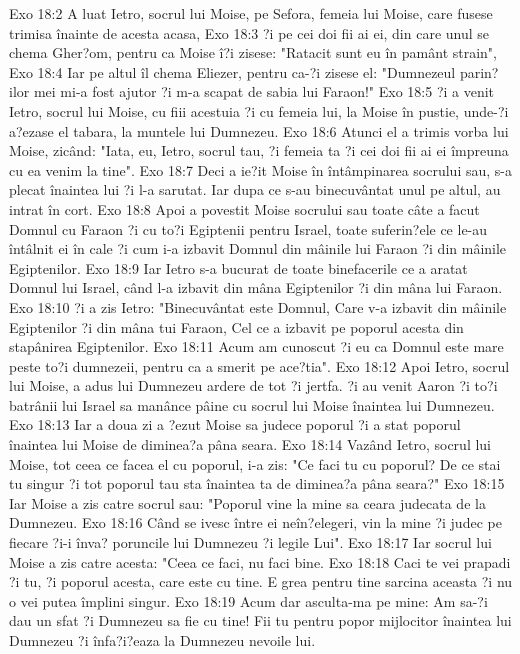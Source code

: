 Exo 18:2  A luat Ietro, socrul lui Moise, pe Sefora, femeia lui Moise, care fusese trimisa înainte de acesta acasa,
Exo 18:3  ?i pe cei doi fii ai ei, din care unul se chema Gher?om, pentru ca Moise î?i zisese: "Ratacit sunt eu în pamânt strain",
Exo 18:4  Iar pe altul îl chema Eliezer, pentru ca-?i zisese el: "Dumnezeul parin?ilor mei mi-a fost ajutor ?i m-a scapat de sabia lui Faraon!"
Exo 18:5  ?i a venit Ietro, socrul lui Moise, cu fiii acestuia ?i cu femeia lui, la Moise în pustie, unde-?i a?ezase el tabara, la muntele lui Dumnezeu.
Exo 18:6  Atunci el a trimis vorba lui Moise, zicând: "Iata, eu, Ietro, socrul tau, ?i femeia ta ?i cei doi fii ai ei împreuna cu ea venim la tine".
Exo 18:7  Deci a ie?it Moise în întâmpinarea socrului sau, s-a plecat înaintea lui ?i l-a sarutat. Iar dupa ce s-au binecuvântat unul pe altul, au intrat în cort.
Exo 18:8  Apoi a povestit Moise socrului sau toate câte a facut Domnul cu Faraon ?i cu to?i Egiptenii pentru Israel, toate suferin?ele ce le-au întâlnit ei în cale ?i cum i-a izbavit Domnul din mâinile lui Faraon ?i din mâinile Egiptenilor.
Exo 18:9  Iar Ietro s-a bucurat de toate binefacerile ce a aratat Domnul lui Israel, când l-a izbavit din mâna Egiptenilor ?i din mâna lui Faraon.
Exo 18:10  ?i a zis Ietro: "Binecuvântat este Domnul, Care v-a izbavit din mâinile Egiptenilor ?i din mâna tui Faraon, Cel ce a izbavit pe poporul acesta din stapânirea Egiptenilor.
Exo 18:11  Acum am cunoscut ?i eu ca Domnul este mare peste to?i dumnezeii, pentru ca a smerit pe ace?tia".
Exo 18:12  Apoi Ietro, socrul lui Moise, a adus lui Dumnezeu ardere de tot ?i jertfa. ?i au venit Aaron ?i to?i batrânii lui Israel sa manânce pâine cu socrul lui Moise înaintea lui Dumnezeu.
Exo 18:13  Iar a doua zi a ?ezut Moise sa judece poporul ?i a stat poporul înaintea lui Moise de diminea?a pâna seara.
Exo 18:14  Vazând Ietro, socrul lui Moise, tot ceea ce facea el cu poporul, i-a zis: "Ce faci tu cu poporul? De ce stai tu singur ?i tot poporul tau sta înaintea ta de diminea?a pâna seara?"
Exo 18:15  Iar Moise a zis catre socrul sau: "Poporul vine la mine sa ceara judecata de la Dumnezeu.
Exo 18:16  Când se ivesc între ei neîn?elegeri, vin la mine ?i judec pe fiecare ?i-i înva? poruncile lui Dumnezeu ?i legile Lui".
Exo 18:17  Iar socrul lui Moise a zis catre acesta: "Ceea ce faci, nu faci bine.
Exo 18:18  Caci te vei prapadi ?i tu, ?i poporul acesta, care este cu tine. E grea pentru tine sarcina aceasta ?i nu o vei putea împlini singur.
Exo 18:19  Acum dar asculta-ma pe mine: Am sa-?i dau un sfat ?i Dumnezeu sa fie cu tine! Fii tu pentru popor mijlocitor înaintea lui Dumnezeu ?i înfa?i?eaza la Dumnezeu nevoile lui.
